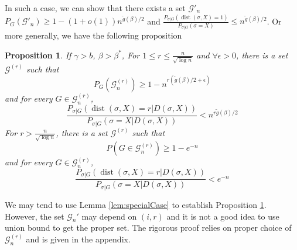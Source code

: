 \documentclass[journal]{IEEEtran}
\newtheorem{proposition}{Proposition}
\newcommand{\cG}{\mathcal{G}}
\DeclareMathOperator{\dist}{dist}
\begin{document}
In such a case, we can show that there exists a set $\cG'_n$
$P_G(\cG'_n) \geq 1 - (1+o(1))n^{\tilde{g}(\beta)/2}$ and 
$\frac{P_{\sigma |G } (\dist(\sigma, X)=1)}{P_{\sigma |G } (\sigma = X)} \leq n^{\tilde{g}(\beta)/2}$.
Or more generally, we have the following proposition
\begin{proposition}\label{prop:small}
If $\gamma>b$, $\beta>\beta^\ast$,
For $1\leq r \leq \frac{n}{\sqrt{\log n}}$
and $\forall \epsilon > 0$, there is a set $\cG^{(r)}$ such that
\begin{equation}\label{eq:Gr}
P_G(\cG^{(r)}_n) \ge 1 - n^{r(\tilde{g}(\beta)/2 + \epsilon)}
\end{equation}
and
for every $G\in\cG^{(r)}_n$,
\begin{equation}\label{eq:psigmaX}
\frac{P_{\sigma|G}(\dist(\sigma, X)=r | D(\sigma, X))}
{P_{\sigma|G}(\sigma=X | D(\sigma, X))} <
n^{r \tilde{g}(\beta) /2}
\end{equation}
For $r> \frac{n}{\sqrt{\log n}}$, there is a set $\cG^{(r)}$ such that
\begin{equation}\label{eq:Gr1}
P(G\in\cG^{(r)}_n) \ge 1 - e^{-n}
\end{equation}
and
for every $G\in\cG^{(r)}_n$,
\begin{equation}\label{eq:psigmaX1}
\frac{P_{\sigma|G}(\dist(\sigma, X)=r | D(\sigma, X))}
{P_{\sigma|G}(\sigma=X | D(\sigma, X))} <
e^{-n}
\end{equation}
\end{proposition}
We may tend to use Lemma \ref{lem:specialCase} to establish Proposition \ref{prop:small}. However, the set $\cG_n'$ may depend
on $(i,r)$ and it is not a good idea to use union bound to get the proper set. The rigorous proof relies on
proper choice of $\cG_n^{(r)}$
and is given in
the appendix.
\end{document}
